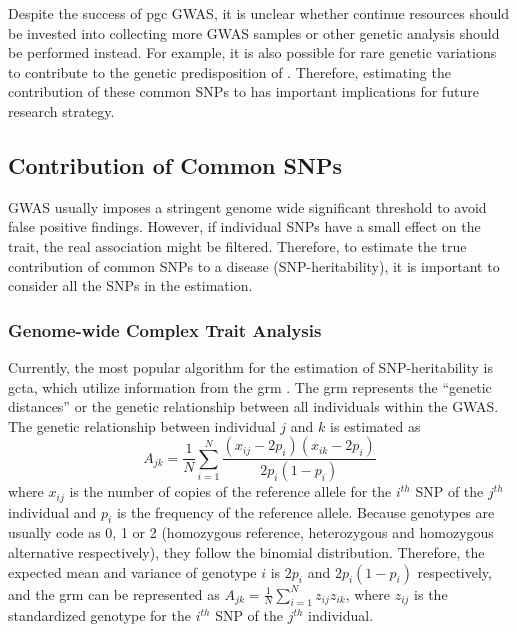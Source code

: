 	
	Despite the success of \gls{pgc}  \gls{GWAS}, it is unclear whether continue resources should be invested into collecting more \gls{GWAS} samples or other genetic analysis should be performed instead. 
	For example, it is also possible for rare genetic variations to contribute to the genetic predisposition of .
	Therefore, estimating the contribution of these common \glspl{SNP} to  has important implications for future research strategy.
	
	\subsection{Contribution of Common SNPs}
	\gls{GWAS} usually imposes a stringent genome wide significant threshold to avoid false positive findings. 
	However, if individual \glspl{SNP} have a small effect on the trait, the real association might be filtered.
	Therefore, to estimate the true contribution of common \glspl{SNP} to a disease (\gls{SNP}-heritability), it is important to consider all the \glspl{SNP} in the estimation.
	
	\subsubsection{Genome-wide Complex Trait Analysis}
	Currently, the most popular algorithm for the estimation of \gls{SNP}-heritability is \gls{gcta}, which utilize information from the \gls{grm} \citep{Yang2011}.
	The \gls{grm} represents the ``genetic distances'' or the genetic relationship between all individuals within the \gls{GWAS}.
	The genetic relationship between individual $j$ and $k$ is estimated as 
	\begin{equation}
	A_{jk} = \frac{1}{N}\sum^N_{i=1}\frac{(x_{ij}-2p_i)(x_{ik}-2p_i)}{2p_i(1-p_i)}
	\end{equation}
	where $x_{ij}$ is the number of copies of the reference allele for the $i^{th}$ \gls{SNP} of the $j^{th}$ individual and $p_i$ is the frequency of the reference allele.
	Because genotypes are usually code as 0, 1 or 2 (homozygous reference, heterozygous and homozygous alternative respectively), they follow the binomial distribution.
	Therefore, the expected mean and variance of genotype $i$ is $2p_i$ and $2p_i(1-p_i)$ respectively, and the \gls{grm} can be represented as $A_{jk} = \frac{1}{N}\sum^N_{i=1}z_{ij}z_{ik}$, where $z_{ij}$ is the standardized genotype for the $i^{th}$ \gls{SNP} of the $j^{th}$ individual.
	
